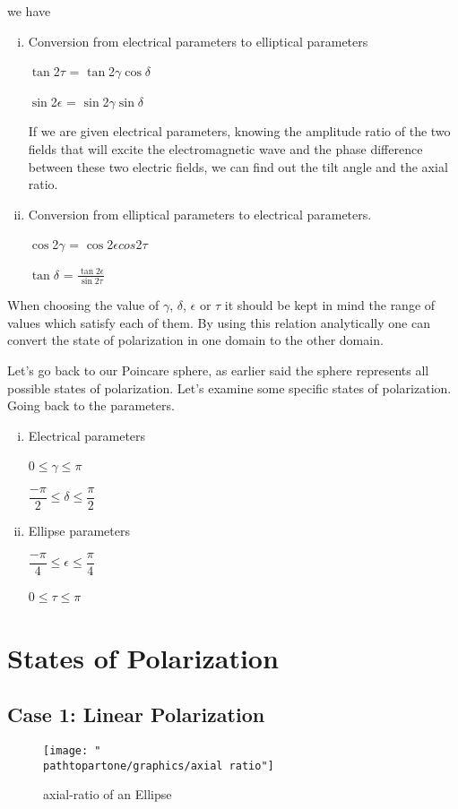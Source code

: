 we have 
\begin{enumerate}[(i)]
\item Conversion from electrical parameters to elliptical parameters

$\tan$2$\tau$ = $\tan$2$\gamma$$\cos$$\delta$

$\sin$2$\epsilon$ = $\sin$2$\gamma$$\sin$$\delta$

If we are given electrical parameters, knowing the amplitude ratio of the two fields that will excite the electromagnetic wave and the phase difference between these two electric fields, we can find out the tilt angle and the axial ratio.
\item Conversion from elliptical parameters to electrical parameters.

$\cos$2$\gamma$ = $\cos$2$\epsilon$$cos$2$\tau$

$\tan$$\delta$	= $\frac{\tan2\epsilon}{\sin2\tau}$
\end{enumerate}
When choosing the value of $\gamma$, $\delta$, $\epsilon$ or $\tau$ it should be kept in mind the range of values which satisfy each of them. By using this relation analytically one can convert the state of polarization in one domain to the other domain.

Let's go back to our Poincare sphere, as earlier said the sphere represents all possible states of polarization. Let's examine some specific states of polarization. Going back to the parameters.
\begin{enumerate}[(i)]
\item Electrical parameters 

0$\leq$$\gamma$$\leq$$\pi$

$\dfrac{-\pi}{2}$$\leq$$\delta$$\leq$$\dfrac{\pi}{2}$
\item Ellipse parameters

$\dfrac{-\pi}{4}$$\leq$$\epsilon$$\leq$$\dfrac{\pi}{4}$

0$\leq$$\tau$$\leq$$\pi$
\end{enumerate}

\section{States of Polarization}
\subsection{Case 1: Linear Polarization}

\begin{figure}[h]
\centering
\texttt{[image: "\\pathtopartone/graphics/axial ratio"]}
\caption{axial-ratio of an Ellipse}
\label{fig:axial-ratio}
\end{figure}

